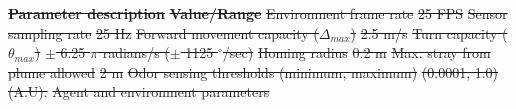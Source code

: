 \documentclass[5p,twocolumn,authoryear]{elsarticle}
\providecommand{\DIFdeltex}[1]{{\protect\color{red}\sout{#1}}}                      %
\providecommand{\DIFdelFL}[1]{\DIFdel{#1}} %
\providecommand{\DIFdel}[1]{\texorpdfstring{\DIFdeltex{#1}}{}} %
\begin{document}
\textbf{\DIFdelFL{Parameter description}} %
\textbf{\DIFdelFL{Value/Range}} %
\DIFdelFL{Environment frame rate  }%
\DIFdelFL{25 FPS  }%
\DIFdelFL{Sensor sampling rate }%
\DIFdelFL{25 Hz  }%
\DIFdelFL{Forward movement capacity ($\Delta_{max}$) }%
\DIFdelFL{2.5 m/s  }%
\DIFdelFL{Turn capacity ($\theta_{max}$) }%
\DIFdelFL{$\pm$ 6.25 $\pi$ radians/s ($\pm$ 1125 $^\circ$/sec)  }%
\DIFdelFL{Homing radius }%
\DIFdelFL{0.2 m  }%
\DIFdelFL{Max. stray from plume allowed }%
\DIFdelFL{2 m  }%
\DIFdelFL{Odor sensing thresholds (minimum, maximum) }%
\DIFdelFL{(0.0001, 1.0) (A.U).  }%
{%
\DIFdelFL{Agent and environment parameters}}
\end{document}
